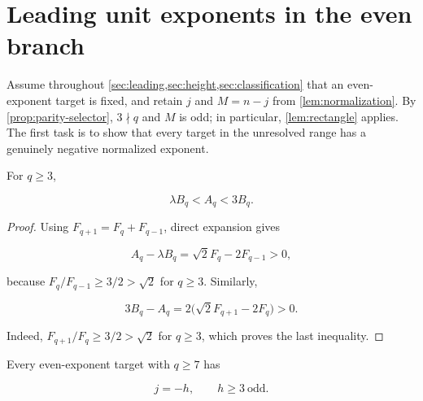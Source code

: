 %
%
\section{Leading unit exponents in the even branch}
\label{sec:leading}

Assume throughout \cref{sec:leading,sec:height,sec:classification} that an
even-exponent target is fixed, and retain $j$ and $M=n-j$ from
\cref{lem:normalization}. By \cref{prop:parity-selector}, $3\nmid q$ and
$M$ is odd; in particular, \cref{lem:rectangle} applies. The first task is
to show that every target in the unresolved range has a genuinely negative
normalized exponent.

\begin{lemma}
\label{lem:ratio-bounds}
For $q\geqslant3$,

\begin{equation}
 \lambda B_q<A_q<3B_q.
 \label{eq:AB-ratio}
\end{equation}
\end{lemma}

\begin{proof}
Using $F_{q+1}=F_q+F_{q-1}$, direct expansion gives

\begin{equation}
 A_q-\lambda B_q=\sqrt2F_q-2F_{q-1}>0,
\end{equation}

because $F_q/F_{q-1}\geqslant3/2>\sqrt2$ for $q\geqslant3$.
Similarly,

\begin{equation}
 3B_q-A_q=2\bigl(\sqrt2F_{q+1}-2F_q\bigr)>0.
\end{equation}

Indeed, $F_{q+1}/F_q\geqslant3/2>\sqrt2$ for $q\geqslant3$, which proves
the last inequality.
\end{proof}

\begin{proposition}
\label{prop:negative-exponent}
Every even-exponent target with $q\geqslant7$ has

\begin{equation}
 j=-h,
 \qquad
 h\geqslant3\ \text{odd}.
 \label{eq:j-negative}
\end{equation}
\end{proposition}

